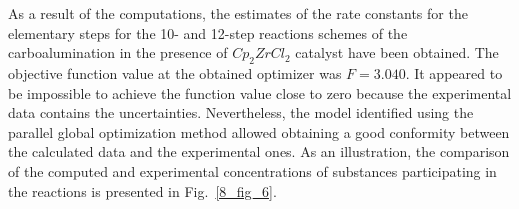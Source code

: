 As a result of the computations, the estimates of the rate constants for the elementary steps for the 10- and 12-step reactions schemes of the carboalumination in the presence of $Cp_2 ZrCl_2$ catalyst have been obtained. The objective function value at the obtained optimizer was $F = 3.040$. It appeared to be impossible to achieve the function value close to zero because the experimental data contains the uncertainties. Nevertheless, the model identified using the parallel global optimization method allowed obtaining a good conformity between the calculated data and the experimental ones. As an illustration, the comparison of the computed and experimental concentrations of substances participating in the reactions is presented in Fig.~\ref{8_fig_6}.

\begin{figure}
\begin{minipage}{0.5\linewidth}
\end{minipage}
\hfill
\begin{minipage}{0.5\linewidth}

\end{minipage}
\end{figure}
